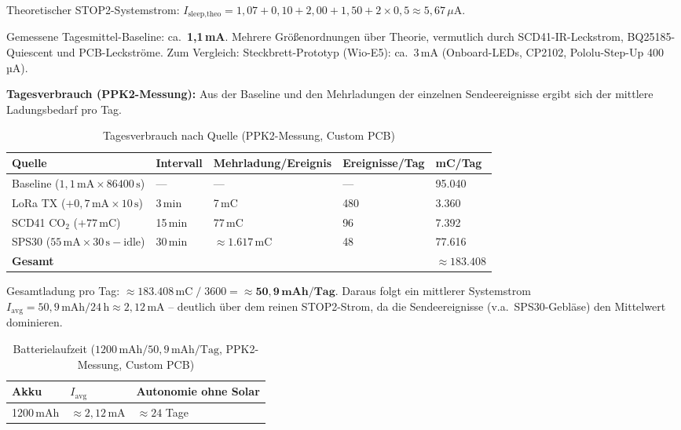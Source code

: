 \documentclass[11pt,a4paper]{scrartcl}
\begin{document}
Theoretischer STOP2-Systemstrom: $I_\text{sleep,theo} = 1{,}07 + 0{,}10 + 2{,}00 + 1{,}50 + 2\times0{,}5 \approx 5{,}67\,\mu\text{A}$.

Gemessene Tagesmittel-Baseline: ca.~\textbf{1,1\,mA}. Mehrere Größenordnungen über Theorie, vermutlich durch SCD41-IR-Leckstrom, BQ25185-Quiescent und PCB-Leckströme. Zum Vergleich: Steckbrett-Prototyp (Wio-E5): ca.~3\,mA (Onboard-LEDs, CP2102, Pololu-Step-Up 400\,µA).

\textbf{Tagesverbrauch (PPK2-Messung):} Aus der Baseline und den Mehrladungen der einzelnen Sendeereignisse ergibt sich der mittlere Ladungsbedarf pro Tag.

\begin{table}[H]
  \centering
  \begin{tabular}{lllll}
    \hline
    \textbf{Quelle} & \textbf{Intervall} & \textbf{Mehrladung/Ereignis} & \textbf{Ereignisse/Tag} & \textbf{mC/Tag} \\
    \hline
    Baseline ($1{,}1\,\text{mA}\times86400\,\text{s}$)    & ---     & ---                   & ---  & 95.040 \\
    LoRa TX ($+0{,}7\,\text{mA}\times10\,\text{s}$)        & 3\,min  & 7\,mC                 & 480  & 3.360  \\
    SCD41 CO$_2$ ($+77\,\text{mC}$)                        & 15\,min & 77\,mC                & 96   & 7.392  \\
    SPS30 ($55\,\text{mA}\times30\,\text{s}-\text{idle}$)  & 30\,min & ${\approx}1.617\,\text{mC}$ & 48   & 77.616 \\
    \hline
    \textbf{Gesamt} &  &  &  & \textbf{${\approx}183.408$} \\
    \hline
  \end{tabular}
  \caption{Tagesverbrauch nach Quelle (PPK2-Messung, Custom PCB)}
\end{table}

Gesamtladung pro Tag: ${\approx}183.408\,\text{mC} \;/\; 3600 = \mathbf{{\approx}50{,}9\,\text{mAh/Tag}}$. Daraus folgt ein mittlerer Systemstrom $I_\text{avg} = 50{,}9\,\text{mAh} / 24\,\text{h} \approx 2{,}12\,\text{mA}$ -- deutlich über dem reinen STOP2-Strom, da die Sendeereignisse (v.a.\ SPS30-Gebläse) den Mittelwert dominieren.

\begin{table}[H]
  \centering
  \begin{tabular}{lll}
    \hline
    \textbf{Akku} & \textbf{$I_\text{avg}$} & \textbf{Autonomie ohne Solar} \\
    \hline
    1200\,mAh & ${\approx}2{,}12$\,mA & $\approx24$ Tage \\
    \hline
  \end{tabular}
  \caption{Batterielaufzeit ($1200\,\text{mAh} / 50{,}9\,\text{mAh/Tag}$, PPK2-Messung, Custom PCB)}
\end{table}
\end{document}
